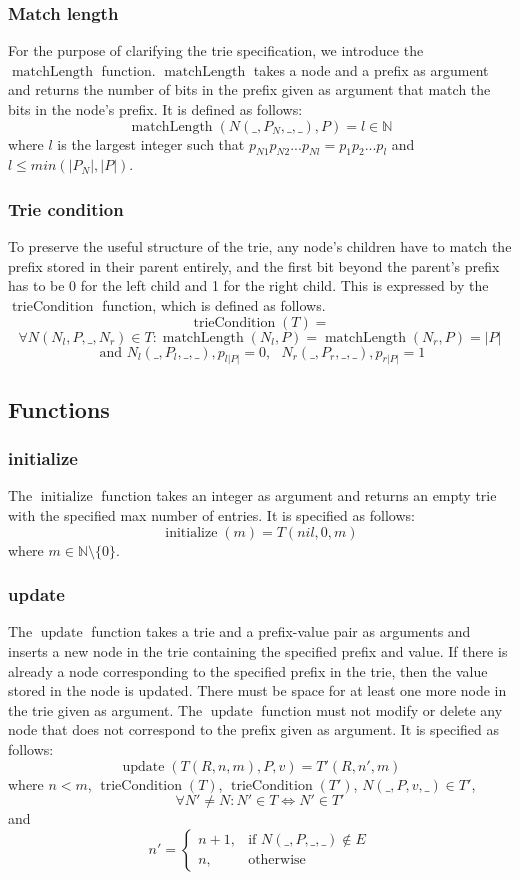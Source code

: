 \documentclass{article}
\DeclareMathOperator{\matchlength}{matchLength}
\DeclareMathOperator{\triecond}{trieCondition}
\DeclareMathOperator{\initialize}{initialize}
\DeclareMathOperator{\update}{update}
\begin{document}
\subsubsection{Match length}
For the purpose of clarifying the trie specification, we introduce the
$\matchlength$ function. $\matchlength$ takes a node and a prefix as argument and
returns the number of bits in the prefix given as argument that match the
bits in the node's prefix. It is defined as follows:
\[
    \matchlength(N(\_, P_N, \_, \_), P) = l \in \mathbb{N}
\]
where $l$ is the largest integer such that $p_{N1}p_{N2}...p_{Nl} = p_1p_2...p_l$
and $l \leq min(|P_N|, |P|)$.
\subsubsection{Trie condition}
To preserve the useful structure of the trie, any node's children have to match
the prefix stored in their parent entirely, and the first bit beyond the
parent's prefix has to be 0 for the left child and 1 for the right child.
This is expressed by the $\triecond$ function, which is defined as follows.
\[
    \triecond(T) =
\]
\[
    \forall N(N_l, P, \_, N_r) \in T: \matchlength(N_l, P) = \matchlength(N_r, P) = |P|
\]
\[
    \text{ and } N_l(\_, P_l, \_, \_), p_{l|P|} = 0, \text{ } N_r(\_, P_r, \_, \_), p_{r|P|} = 1
\]
\subsection{Functions}
\subsubsection{initialize}
The $\initialize$ function takes an integer as argument and returns an empty trie
with the specified max number of entries. It is specified as follows:
\[
    \initialize(m) = T(nil, 0, m)
\]
where $m \in \mathbb{N} \setminus \{0\}$.
\subsubsection{update}
The $\update$ function takes a trie and a prefix-value pair as arguments and
inserts a new node in the trie containing the specified prefix and value. If
there is already a node corresponding to the specified prefix in the trie, then
the value stored in the node is updated. There must be space for at least one
more node in the trie given as argument. The $\update$ function must not modify
or delete any node that does not correspond to the prefix given as argument. It
is specified as follows:
\[
    \update(T(R, n, m), P, v) = T'(R, n', m)
\]
where $n < m$, $\triecond(T)$, $\triecond(T')$, $N(\_, P, v, \_) \in T'$,
\[
    \forall N' \neq N: N' \in T \Leftrightarrow N' \in T'
\]
and
\[
    n'=
    \begin{cases}
    n+1,   & \text{if } N(\_, P, \_, \_) \notin E\\
    n,  & \text{otherwise}
    \end{cases}
\]
\end{document}
